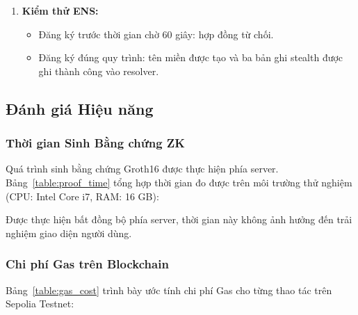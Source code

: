 \documentclass[../DoAn.tex]{subfiles}
\begin{document}
\begin{enumerate}
    \item \textbf{Kiểm thử ENS:}
    \begin{itemize}
        \item Đăng ký trước thời gian chờ 60 giây: hợp đồng từ chối.
        \item Đăng ký đúng quy trình: tên miền được tạo và ba bản ghi stealth được ghi thành công vào resolver.
    \end{itemize}
\end{enumerate}

\subsection{Đánh giá Hiệu năng}
\label{subsec:performance}

\subsubsection{Thời gian Sinh Bằng chứng ZK}

Quá trình sinh bằng chứng Groth16 được thực hiện phía server. Bảng~\ref{table:proof_time} tổng hợp thời gian đo được trên môi trường thử nghiệm (CPU: Intel Core i7, RAM: 16 GB):

\begin{table}[H]
\centering
{}
\caption{Thời gian sinh bằng chứng Groth16 trên server}
\label{table:proof_time}
\end{table}

Được thực hiện bất đồng bộ phía server, thời gian này không ảnh hưởng đến trải nghiệm giao diện người dùng.

\subsubsection{Chi phí Gas trên Blockchain}

Bảng~\ref{table:gas_cost} trình bày ước tính chi phí Gas cho từng thao tác trên Sepolia Testnet:
\end{document}
